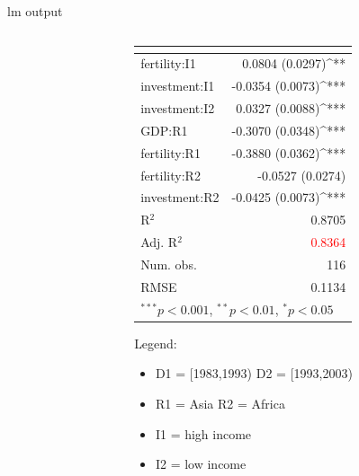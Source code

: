 \documentclass[9pt]{beamer}
\begin{document}
\begin{frame}{lm output}
\begin{columns}[T]
\begin{column}[T]{5cm}
\begin{tabular}{l D{)}{)}{17)3} }
			\end{tabular}
		\end{column}
		\begin{column}[T]{5cm} 
			\begin{tabular}{l D{)}{)}{17)3} }
				\toprule
				&  \\
				\midrule
				fertility:I1  & 0.0804 \; (0.0297)^{**}   \\
				investment:I1 & -0.0354 \; (0.0073)^{***} \\
				investment:I2 & 0.0327 \; (0.0088)^{***}  \\
				GDP:R1        & -0.3070 \; (0.0348)^{***} \\
				fertility:R1  & -0.3880 \; (0.0362)^{***} \\
				fertility:R2  & -0.0527 \; (0.0274)       \\
				investment:R2 & -0.0425 \; (0.0073)^{***} \\
				\midrule
				R$^2$         & 0.8705                    \\
				Adj. R$^2$    & \textcolor{red}{0.8364}                   \\
				Num. obs.     & 116                       \\
				RMSE          & 0.1134                    \\
				\bottomrule
			\end{tabular}
			{\footnotesize  
				 Legend:\begin{itemize}
					\item D1 = [1983,1993) \enskip D2 = [1993,2003)
					\item R1 = Asia \enskip R2 = Africa
					\item I1 = high income
					\item I2 = low income
					
				\end{itemize}
			}
			
		\end{column}
	\end{columns}
\end{frame}
\end{document}
